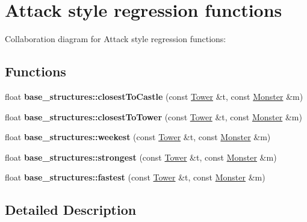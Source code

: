 \hypertarget{group__attack__styles}{}\section{Attack style regression functions}
\label{group__attack__styles}
Collaboration diagram for Attack style regression functions\+:
\subsection*{Functions}
\begin{DoxyCompactItemize}
\item 
\mbox{\label{group__attack__styles_ga83c4bea653ee43467fd5cf9122dd88bf}} 
float {\bfseries base\+\_\+structures\+::closest\+To\+Castle} (const \hyperlink{classbase__structures_1_1Tower}{Tower} \&t, const \hyperlink{classbase__structures_1_1Monster}{Monster} \&m)
\item 
\mbox{\label{group__attack__styles_gaba79bf7de09042e247229f5f558b4989}} 
float {\bfseries base\+\_\+structures\+::closest\+To\+Tower} (const \hyperlink{classbase__structures_1_1Tower}{Tower} \&t, const \hyperlink{classbase__structures_1_1Monster}{Monster} \&m)
\item 
\mbox{\label{group__attack__styles_ga8deb8818c2f370ca480ea0e98c24a907}} 
float {\bfseries base\+\_\+structures\+::weekest} (const \hyperlink{classbase__structures_1_1Tower}{Tower} \&t, const \hyperlink{classbase__structures_1_1Monster}{Monster} \&m)
\item 
\mbox{\label{group__attack__styles_ga4b2866d3daf5500dcdbe7887c42910b6}} 
float {\bfseries base\+\_\+structures\+::strongest} (const \hyperlink{classbase__structures_1_1Tower}{Tower} \&t, const \hyperlink{classbase__structures_1_1Monster}{Monster} \&m)
\item 
\mbox{\label{group__attack__styles_gabf07e91aa094f84079534012135548f1}} 
float {\bfseries base\+\_\+structures\+::fastest} (const \hyperlink{classbase__structures_1_1Tower}{Tower} \&t, const \hyperlink{classbase__structures_1_1Monster}{Monster} \&m)
\end{DoxyCompactItemize}


\subsection{Detailed Description}
